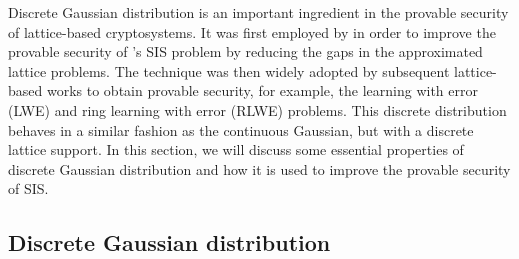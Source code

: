 \documentclass[../main.tex]{subfiles}
\begin{document}


Discrete Gaussian distribution is an important ingredient in the provable security of lattice-based cryptosystems. It was first employed by \citet{micciancio07worst} in order to improve the provable security of \citet{ajtai1996generating}'s SIS problem by reducing the gaps in the approximated lattice problems. The technique was then widely adopted by subsequent lattice-based works to obtain provable security, for example, the learning with error (LWE) and ring learning with error (RLWE) problems. This discrete distribution behaves in a similar fashion as the continuous Gaussian, but with a discrete lattice support. In this section, we will discuss some essential properties of discrete Gaussian distribution and how it is used to improve the provable security of SIS. 

\subsection{Discrete Gaussian distribution}
\end{document}
